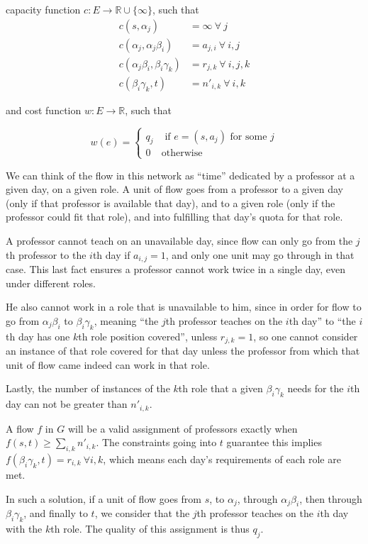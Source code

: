 capacity function $c:E \to \mathbb{R} \cup \{\infty\}$, such that
\begin{align*}
c(s, \alpha_j) &= \infty\ \forall\ j\\
c(\alpha_j, \alpha_j \beta_i) &= a_{j, i}\ \forall\ i, j\\
c(\alpha_j \beta_i, \beta_i \gamma_k) &= r_{j, k}\ \forall\ i, j, k\\
c(\beta_i \gamma_k, t) &= n'_{i, k}\ \forall\ i, k
\end{align*}

and cost function $w:E \to \mathbb{R}$, such that

$$
w(e) =
\begin{cases}
q_j &\text{ if } e = (s, a_j) \text{ for some }j\\
0 & \text{otherwise}
\end{cases}
$$

We can think of the flow in this network as ``time'' dedicated by a professor at a given day, on a given role. A unit of flow goes from a professor to a given day (only if that professor is available that day), and to a given role (only if the professor could fit that role), and into fulfilling that day's quota for that role.

A professor cannot teach on an unavailable day, since flow can only go from the $j$th professor to the $i$th day if $a_{i, j} = 1$, and only one unit may go through in that case. This last fact ensures a professor cannot work twice in a single day, even under different roles.

He also cannot work in a role that is unavailable to him, since in order for flow to go from $\alpha_j \beta_i$ to $\beta_i \gamma_k$, meaning ``the $j$th professor teaches on the $i$th day'' to ``the $i$th day has one $k$th role position covered'', unless $r_{j, k} = 1$, so one cannot consider an instance of that role covered for that day unless the professor from which that unit of flow came indeed can work in that role.

Lastly, the number of instances of the $k$th role that a given $\beta_i \gamma_k$ needs for the $i$th day can not be greater than $n'_{i, k}$.

A flow $f$ in $G$ will be a valid assignment of professors exactly when $f(s, t) \ge \sum_{i, k} n'_{i, k}$. The constraints going into $t$ guarantee this implies $f(\beta_i \gamma_k, t) = r_{i, k}\ \forall i, k$, which means each day's requirements of each role are met.

In such a solution, if a unit of flow goes from $s$, to $\alpha_j$, through $\alpha_j \beta_i$, then through $\beta_i \gamma_k$, and finally to $t$, we consider that the $j$th professor teaches on the $i$th day with the $k$th role. The quality of this assignment is thus $q_j$.

